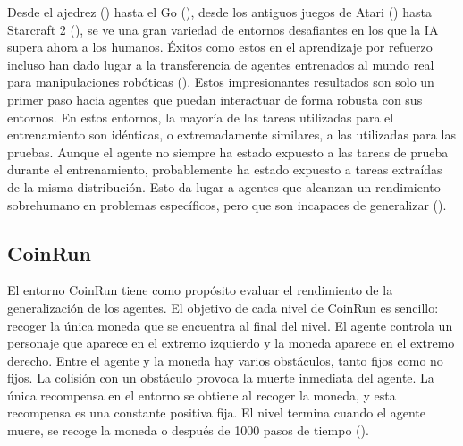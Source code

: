Desde el ajedrez (\cite{silver2017mastering}) hasta el Go (\cite{silver2016mastering}), desde los antiguos juegos de Atari (\cite{bellemare2013arcade}) hasta Starcraft 2 (\cite{vinyals2017starcraft}), se ve una gran variedad de entornos desafiantes en los que la IA supera ahora a los humanos. Éxitos como estos en el aprendizaje por refuerzo incluso han dado lugar a la transferencia de agentes entrenados al mundo real para manipulaciones robóticas (\cite{andrychowicz2020learning}). Estos impresionantes resultados son solo un primer paso hacia agentes que puedan interactuar de forma robusta con sus entornos. En estos entornos, la mayoría de las tareas utilizadas para el entrenamiento son idénticas, o extremadamente similares, a las utilizadas para las pruebas. Aunque el agente no siempre ha estado expuesto a las tareas de prueba durante el entrenamiento, probablemente ha estado expuesto a tareas extraídas de la misma distribución. Esto da lugar a agentes que alcanzan un rendimiento sobrehumano en problemas específicos, pero que son incapaces de generalizar (\cite{packer2018assessing}).

\subsection{CoinRun}

El entorno CoinRun tiene como propósito evaluar el rendimiento de la generalización de los agentes. El objetivo de cada nivel de CoinRun es sencillo: recoger la única moneda que se encuentra al final del nivel. El agente controla un personaje que aparece en el extremo izquierdo y la moneda aparece en el extremo derecho. Entre el agente y la moneda hay varios obstáculos, tanto fijos como no fijos. La colisión con un obstáculo provoca la muerte inmediata del agente. La única recompensa en el entorno se obtiene al recoger la moneda, y esta recompensa es una constante positiva fija. El nivel termina cuando el agente muere, se recoge la moneda o después de 1000 pasos de tiempo (\cite{cobbe2019quantifying}).

